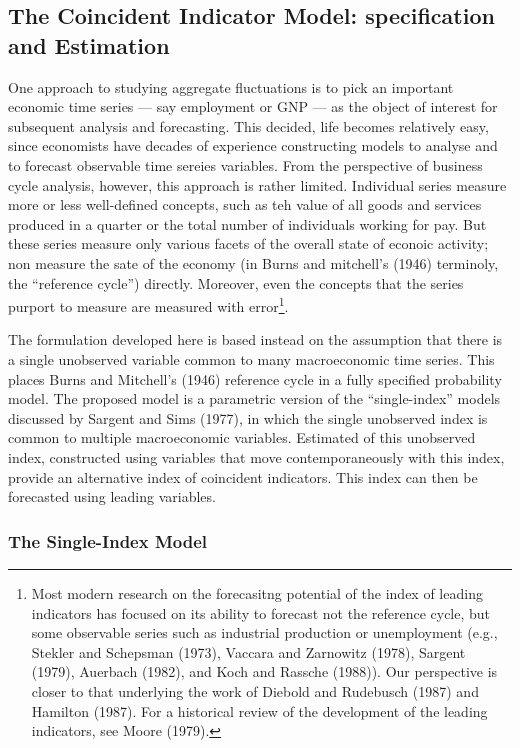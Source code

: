\subsection{The Coincident Indicator Model: specification and Estimation}

One approach to studying aggregate fluctuations is to pick an important economic time series — say employment or GNP — as the object of interest for subsequent analysis and forecasting. This decided, life becomes relatively easy, since economists have decades of experience constructing models to analyse and to forecast observable time sereies variables. From the perspective of business cycle analysis, however, this approach is rather limited. Individual series measure more or less well-defined concepts, such as teh value of all goods and services produced in a quarter or the total number of individuals working for pay. But these series measure only various facets of the overall state of econoic activity; non measure the sate of the economy (in Burns and mitchell's (1946) terminoly, the ``reference cycle'') directly. Moreover, even the concepts that the series purport to measure are measured with error\footnote{Most modern research on the forecasitng potential of the index of leading indicators has focused on its ability to forecast not the reference cycle, but some observable series such as industrial production or unemployment (e.g., Stekler and Schepsman (1973), Vaccara and Zarnowitz (1978), Sargent (1979), Auerbach (1982), and Koch and Rassche (1988)). Our perspective is closer to that underlying the work of Diebold and Rudebusch (1987) and Hamilton (1987). For a historical review of the development of the leading indicators, see Moore (1979).}.

The formulation developed here is based instead on the assumption that there is a single unobserved variable common to many macroeconomic time series. This places Burns and Mitchell's (1946) reference cycle in a fully specified probability model. The proposed model is a parametric version of the ``single-index'' models discussed by Sargent and Sims (1977), in which the single unobserved index is common to multiple macroeconomic variables. Estimated of this unobserved index, constructed using variables that move contemporaneously with this index, provide an alternative index of coincident indicators. This index can then be forecasted using leading variables.

\subsubsection{The Single-Index Model}


